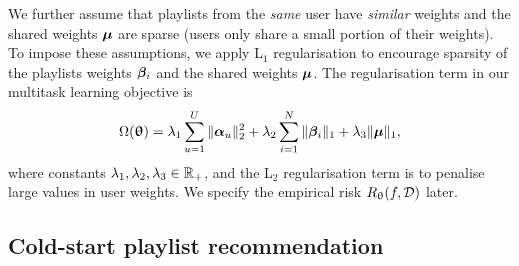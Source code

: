 We further assume that playlists from the \emph{same} user have \emph{similar} weights %
and the shared weights $\bm{\mu}$ are sparse %
(\ie users only share a small portion of their weights).
To impose these assumptions, we apply L$_1$ regularisation to encourage sparsity %
of the playlists weights ${\bm{\beta}}_i$ %
and the shared weights $\bm{\mu}$.
%
The regularisation term in our multitask learning objective is
\begin{equation*}
\Omega({\bm{\uptheta}}) 
= \lambda_1 \sum_{u=1}^U \|{\bm{\alpha}}_u\|_2^2 
  + \lambda_2 \sum_{i=1}^N \|{\bm{\beta}}_i\|_1 
  + \lambda_3 \| \bm{\mu} \|_1,
\end{equation*}
where constants $\lambda_1, \lambda_2, \lambda_3 \in \mathbb{R}_+$,
and the L$_2$ regularisation term is to penalise large values in user weights. %
We specify the empirical risk $R_{\uptheta}(f, \mathcal{D})$ later.


\subsection{Cold-start playlist recommendation}

